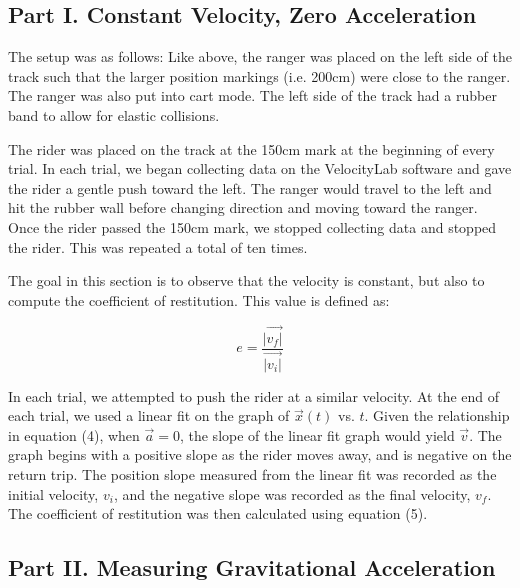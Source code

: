 \documentclass[journal,transmag]{IEEEtran}
\begin{document}
\begin{center} 
    \subsection{Part I. Constant Velocity, Zero Acceleration} 
\end{center}
\indent The setup was as follows: Like above, the ranger  was placed on the left side of the track such that the larger position markings (i.e. 200cm) were close to the ranger. The ranger was also put into cart mode. The left side of the track had a rubber band to allow for elastic collisions. 

\indent The rider was placed on the track at the 150cm mark at the beginning of every trial. In each trial, we began collecting data on the VelocityLab software and gave the rider a gentle push toward the left. The ranger would travel to the left and hit the rubber wall before changing direction and moving toward the ranger. Once the rider passed the 150cm mark, we stopped collecting data and stopped the rider. This was repeated a total of ten times. 

\indent The goal in this section is to observe that the velocity is constant, but also to compute the coefficient of restitution. This value is defined as:

\begin{equation}
    e = \frac{|\Vec{v_f|}}{\Vec{|v_i|}}
\end{equation}

\indent In each trial, we attempted to push the rider at a similar velocity. At the end of each trial, we used a linear fit on the graph of $\Vec{x}(t)$ vs. $t$. Given the relationship in equation (4), when $\Vec{a} = 0$, the slope of the linear fit graph would yield $\Vec{v}$. 
\indent The graph begins with a positive slope as the rider moves away, and is negative on the return trip. The position slope measured from the linear fit was recorded as the initial velocity, $v_i$, and the negative slope was recorded as the final velocity, $v_f$. The coefficient of restitution was then calculated using equation (5).\\



\begin{center}
    \subsection{Part II. Measuring Gravitational Acceleration}
\end{center} 
\end{document}
